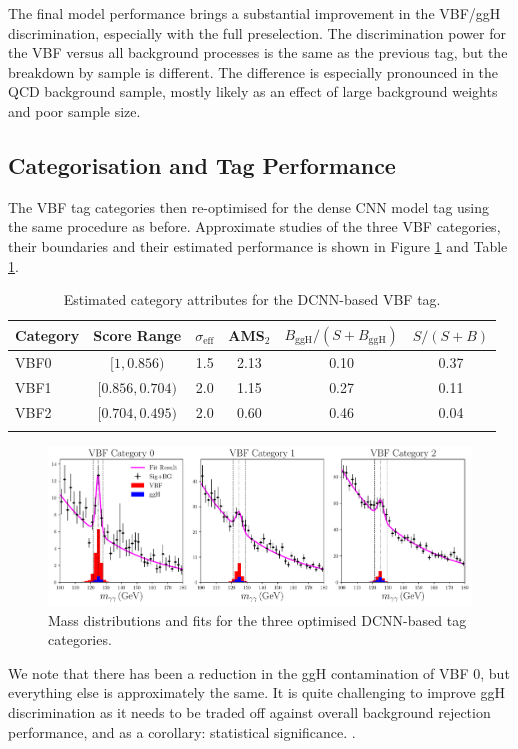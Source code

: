The final model performance brings a substantial improvement in the VBF/ggH discrimination, especially with the full preselection. 
The discrimination power for the VBF versus all background processes is the same as the previous tag, but the breakdown by sample is different. 
The difference is especially pronounced in the QCD background sample, mostly likely as an effect of large background weights and poor sample size. 






\subsection{Categorisation and Tag Performance}
The VBF tag categories then re-optimised for the dense CNN model tag using the same procedure as before.
Approximate studies of the three VBF categories, their boundaries and their estimated performance is shown in Figure \ref{fig:event_categorisation:DCNN_mass_fits} and Table \ref{tab:event_selection:DCNN_cats}.
\begin{table}[h!]
    \centering
    \renewcommand{\arraystretch}{1.3}
    \begin{tabular}{ l | c c c c c }
        \thickhline
        Category & Score Range & $\sigma_{\mathrm{eff}}$ & AMS$_2$ & $B_{\mathrm{ggH}}/(S+B_{\mathrm{ggH}})$ & $S/(S+B)$ \\
        \hline
        VBF0 & $[1, 0.856)$     & 1.5 &  2.13 & 0.10 & 0.37 \\
        VBF1 & $[0.856, 0.704)$ & 2.0 &  1.15  & 0.27 & 0.11 \\
        VBF2 & $[0.704, 0.495)$ & 2.0 &  0.60 & 0.46 & 0.04 \\
        \thickhline
    \end{tabular}
    \caption{Estimated category attributes for the DCNN-based VBF tag.}
    \label{tab:event_selection:DCNN_cats}
\end{table}
\begin{figure}[h!]
    \centering
    \includegraphics[width=1.0\textwidth]{figures/event_selection/DCNN_mass_fits.pdf}
    \caption{Mass distributions and fits for the three optimised DCNN-based tag categories.}
    \label{fig:event_categorisation:DCNN_mass_fits}
\end{figure}
We note that there has been a reduction in the ggH contamination of VBF 0, but everything else is approximately the same. 
It is quite challenging to improve ggH discrimination as it needs to be traded off against overall background rejection performance, and as a corollary: statistical significance. . 









